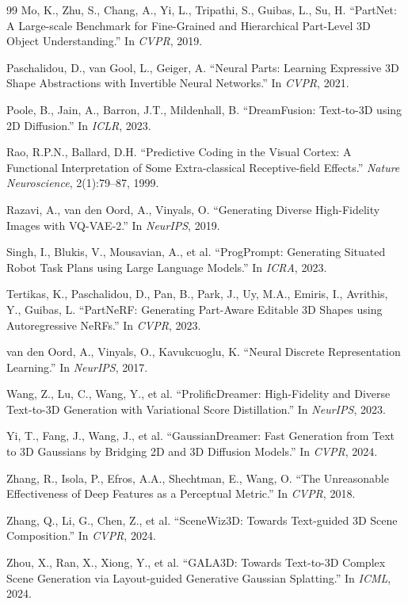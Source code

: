 \documentclass[11pt]{article}
\begin{document}
\begin{thebibliography}{99}
 Mo, K., Zhu, S., Chang, A., Yi, L., Tripathi, S., Guibas, L., Su, H. ``PartNet: A Large-scale Benchmark for Fine-Grained and Hierarchical Part-Level 3D Object Understanding.'' In \textit{CVPR}, 2019.

 Paschalidou, D., van Gool, L., Geiger, A. ``Neural Parts: Learning Expressive 3D Shape Abstractions with Invertible Neural Networks.'' In \textit{CVPR}, 2021.

 Poole, B., Jain, A., Barron, J.T., Mildenhall, B. ``DreamFusion: Text-to-3D using 2D Diffusion.'' In \textit{ICLR}, 2023.

 Rao, R.P.N., Ballard, D.H. ``Predictive Coding in the Visual Cortex: A Functional Interpretation of Some Extra-classical Receptive-field Effects.'' \textit{Nature Neuroscience}, 2(1):79--87, 1999.

 Razavi, A., van den Oord, A., Vinyals, O. ``Generating Diverse High-Fidelity Images with VQ-VAE-2.'' In \textit{NeurIPS}, 2019.

 Singh, I., Blukis, V., Mousavian, A., et al. ``ProgPrompt: Generating Situated Robot Task Plans using Large Language Models.'' In \textit{ICRA}, 2023.

 Tertikas, K., Paschalidou, D., Pan, B., Park, J., Uy, M.A., Emiris, I., Avrithis, Y., Guibas, L. ``PartNeRF: Generating Part-Aware Editable 3D Shapes using Autoregressive NeRFs.'' In \textit{CVPR}, 2023.

 van den Oord, A., Vinyals, O., Kavukcuoglu, K. ``Neural Discrete Representation Learning.'' In \textit{NeurIPS}, 2017.

 Wang, Z., Lu, C., Wang, Y., et al. ``ProlificDreamer: High-Fidelity and Diverse Text-to-3D Generation with Variational Score Distillation.'' In \textit{NeurIPS}, 2023.

 Yi, T., Fang, J., Wang, J., et al. ``GaussianDreamer: Fast Generation from Text to 3D Gaussians by Bridging 2D and 3D Diffusion Models.'' In \textit{CVPR}, 2024.

 Zhang, R., Isola, P., Efros, A.A., Shechtman, E., Wang, O. ``The Unreasonable Effectiveness of Deep Features as a Perceptual Metric.'' In \textit{CVPR}, 2018.

 Zhang, Q., Li, G., Chen, Z., et al. ``SceneWiz3D: Towards Text-guided 3D Scene Composition.'' In \textit{CVPR}, 2024.

 Zhou, X., Ran, X., Xiong, Y., et al. ``GALA3D: Towards Text-to-3D Complex Scene Generation via Layout-guided Generative Gaussian Splatting.'' In \textit{ICML}, 2024.

\end{thebibliography}
\end{document}
